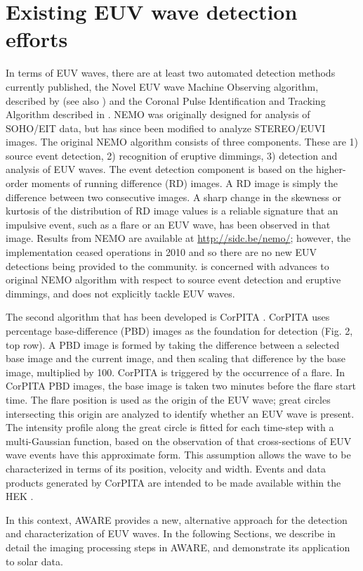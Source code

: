 \section{Existing EUV wave detection efforts}\label{sec:existing}

In terms of EUV waves, there are at least two automated detection
methods currently published, the Novel EUV wave Machine Observing
algorithm, described by \cite{2005SoPh..228..265P} (see also
\cite{2012SoPh..276..479P}) and the Coronal Pulse Identification and
Tracking Algorithm described in \cite{2014SoPh..289.3279L}. NEMO was
originally designed for analysis of SOHO/EIT data, but has since been
modified to analyze STEREO/EUVI images. The original NEMO algorithm
\cite{2005SoPh..228..265P} consists of three components. These are 1)
source event detection, 2) recognition of eruptive dimmings, 3)
detection and analysis of EUV waves. The event detection component is
based on the higher-order moments of running difference (RD) images. A
RD image is simply the difference between two consecutive images. A
sharp change in the skewness or kurtosis of the distribution of RD
image values is a reliable signature that an impulsive event, such as
a flare or an EUV wave, has been observed in that image.  Results from
NEMO are available at \url{http://sidc.be/nemo/}; however, the
implementation ceased operations in 2010 and so there are no new EUV
detections being provided to the community.
\cite{2012SoPh..276..479P} is concerned with advances to original NEMO
algorithm with respect to source event detection and eruptive
dimmings, and does not explicitly tackle EUV waves.



The second algorithm that has been developed is CorPITA
\citep{2014SoPh..289.3279L}. CorPITA uses percentage base-difference
(PBD) images as the foundation for detection (Fig. 2, top row).  A PBD
image is formed by taking the difference between a selected base image
and the current image, and then scaling that difference by the base
image, multiplied by 100.  CorPITA is triggered by the occurrence of a
flare.  In CorPITA PBD images, the base image is taken two minutes
before the flare start time. The flare position is used as the origin
of the EUV wave; great circles intersecting this origin are analyzed
to identify whether an EUV wave is present. The intensity profile
along the great circle is fitted for each time-step with a
multi-Gaussian function, based on the observation of
\cite{2006ApJ...645..757W} that cross-sections of EUV wave events have
this approximate form. This assumption allows the wave to be
characterized in terms of its position, velocity and width. Events and
data products generated by CorPITA are intended to be made available
within the HEK \citep{hek2012, 2012SoPh..275...79M}.  

In this context, AWARE provides a new, alternative approach for the
detection and characterization of EUV waves.  In the following
Sections, we describe in detail the imaging processing steps in AWARE,
and demonstrate its application to solar data.
